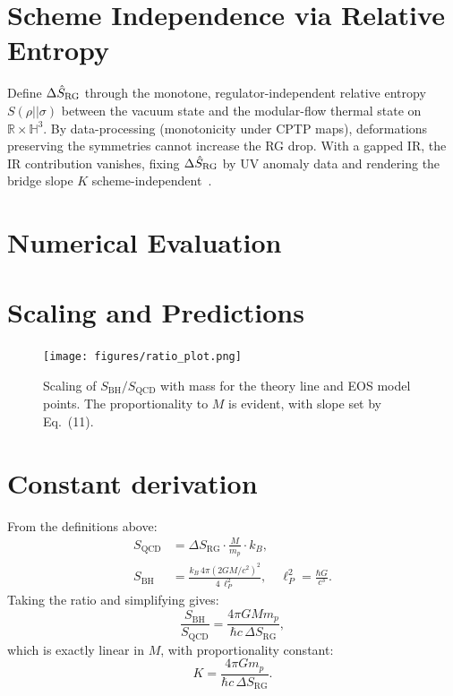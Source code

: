 \documentclass[aps,prd,onecolumn,nofootinbib,superscriptaddress]{revtex4-2}
\begin{document}
\section{Scheme Independence via Relative Entropy}

Define $\Delta\hat S_{\rm RG}$ through the monotone, regulator-independent relative entropy $S(\rho||\sigma)$ between the vacuum state and the modular-flow thermal state on $\mathbb{R}\times\mathbb{H}^3$. 
By data-processing (monotonicity under CPTP maps), deformations preserving the symmetries cannot increase the RG drop. 
With a gapped IR, the IR contribution vanishes, fixing $\Delta\hat S_{\rm RG}$ by UV anomaly data and rendering the bridge slope $K$ scheme-independent~\cite{bousso2015}.

\section{Numerical Evaluation}



\section{Scaling and Predictions}

\begin{figure}[htbp]
\centering
\texttt{[image: figures/ratio\_plot.png]}
\caption{Scaling of $S_{\mathrm{BH}} / S_{\mathrm{QCD}}$ with mass for the theory line and EOS model points. The proportionality to $M$ is evident, with slope set by Eq.~(11).}
\label{fig:ratio}
\end{figure}

\section{Constant derivation}

From the definitions above:
\begin{align}
S_{\mathrm{QCD}} &= \Delta S_{\mathrm{RG}} \cdot \frac{M}{m_p} \cdot k_B, \\
S_{\mathrm{BH}} &= \frac{k_B \, 4 \pi (2GM/c^2)^2}{4 \, \ell_P^2}, \quad \ell_P^2 = \frac{\hbar G}{c^3}.
\end{align}
Taking the ratio and simplifying gives:
\begin{equation}
\frac{S_{\mathrm{BH}}}{S_{\mathrm{QCD}}} = \frac{4 \pi G M m_p}{\hbar c \, \Delta S_{\mathrm{RG}}},
\end{equation}
which is exactly linear in $M$, with proportionality constant:
\begin{equation}
K = \frac{4 \pi G m_p}{\hbar c \, \Delta S_{\mathrm{RG}}}.
\end{equation}
\end{document}
